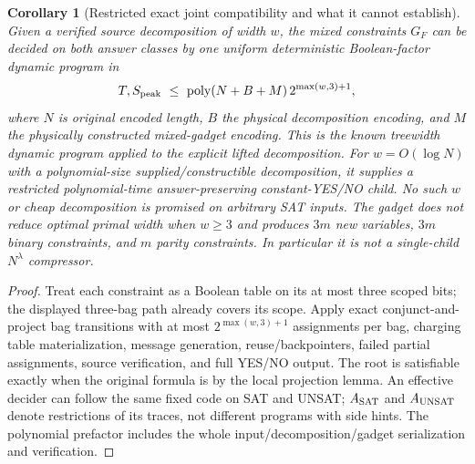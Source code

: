 \documentclass[11pt]{article}
\newtheorem{corollary}[theorem]{Corollary}
\begin{document}
\begin{corollary}[Restricted exact joint compatibility and what it cannot establish]
Given a verified source decomposition of width $w$, the mixed constraints $G_F$ can be decided on both answer classes by one uniform deterministic Boolean-factor dynamic program in
\[
 T,S_{\rm peak}\ \le\ \operatorname{poly}(N+B+M)\,2^{\max(w,3)+1},
\]
where $N$ is original encoded length, $B$ the physical decomposition encoding, and $M$ the physically constructed mixed-gadget encoding. This is the known treewidth dynamic program applied to the explicit lifted decomposition. For $w=O(\log N)$ with a polynomial-size supplied/constructible decomposition, it supplies a restricted polynomial-time answer-preserving constant-YES/NO child. No such $w$ or cheap decomposition is promised on arbitrary SAT inputs. The gadget does not reduce optimal primal width when $w\ge3$ and produces $3m$ new variables, $3m$ binary constraints, and $m$ parity constraints. In particular it is not a single-child $N^\lambda$ compressor.
\end{corollary}
\begin{proof}
Treat each constraint as a Boolean table on its at most three scoped bits; the displayed three-bag path already covers its scope. Apply exact conjunct-and-project bag transitions with at most $2^{\max(w,3)+1}$ assignments per bag, charging table materialization, message generation, reuse/backpointers, failed partial assignments, source verification, and full YES/NO output. The root is satisfiable exactly when the original formula is by the local projection lemma. An effective decider can follow the same fixed code on SAT and UNSAT; $A_{\rm SAT}$ and $A_{\rm UNSAT}$ denote restrictions of its traces, not different programs with side hints. The polynomial prefactor includes the whole input/decomposition/gadget serialization and verification.\end{proof}
\end{document}
